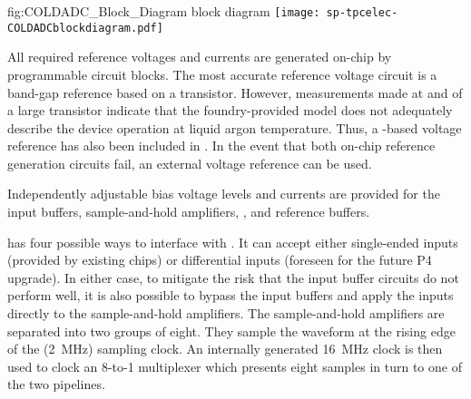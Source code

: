 \begin{dunefigure}
{fig:COLDADC_Block_Diagram}
{ block diagram}
\texttt{[image: sp-tpcelec-COLDADCblockdiagram.pdf]}
\end{dunefigure}

All required reference voltages and currents are generated on-chip by programmable
circuit blocks. The most accurate reference voltage circuit is a band-gap reference
based on a  transistor.  However, measurements made at  and
 of a large  transistor indicate that the foundry-provided  model
does not adequately describe the device operation at liquid argon temperature.  Thus,
a -based voltage reference has also been included in .
In the event that both on-chip reference generation circuits fail, an external voltage
reference can be used.

Independently adjustable bias voltage levels and currents are provided for the
input buffers, sample-and-hold amplifiers, , and 
reference buffers.

 has four possible ways to interface with .  It
can accept either single-ended inputs (provided by existing 
chips) or differential inputs (foreseen for the future  P4 upgrade).
In either case, to mitigate the risk that the input buffer circuits do not perform
well, it is also possible to bypass the input buffers and apply the inputs directly
to the sample-and-hold amplifiers.  The sample-and-hold amplifiers are separated
into two groups of eight.  They sample the waveform at the rising edge of the
(\SI{2}{MHz}) sampling clock.  An internally generated \SI{16}{MHz} clock is then
used to clock an \num{8}-to-\num{1} multiplexer which presents eight samples in 
turn to one of the two  pipelines.

